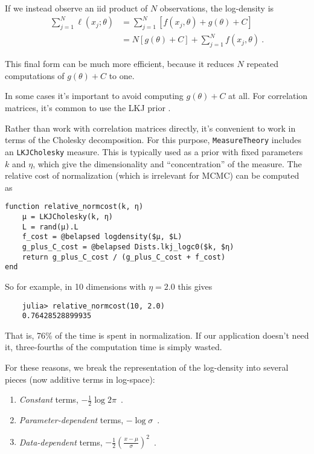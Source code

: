 \documentclass{juliacon}
\begin{document}
If we instead observe an iid product of $N$ observations, the log-density is
\[
\begin{aligned}
\sum_{j=1}^N\ell(x_j; \theta) 
    &= \sum_{j=1}^N \left[ f(x_j,\theta) + g(\theta) + C\right] \\
    &= N [g(\theta) + C] + \sum_{j=1}^N  f(x_j,\theta)\ .
\end{aligned}
\]

This final form can be much more efficient, because it reduces $N$ repeated computations of $g(\theta) + C$ to one. 

In some cases it's important to avoid computing $g(\theta) + C$ at all. For correlation matrices, it's common to use the LKJ prior \cite{LEWANDOWSKI20091989}. 

Rather than work with correlation matrices directly, it's convenient to work in terms of the Cholesky decomposition. For this purpose, \verb|MeasureTheory| includes an \verb|LKJCholesky| measure. This is typically used as a prior with fixed parameters $k$ and $\eta$, which give the dimensionality and ``concentration'' of the measure. The relative cost of normalization (which is irrelevant for MCMC) can be computed as

\begin{verbatim}
function relative_normcost(k, η)
    μ = LKJCholesky(k, η)
    L = rand(μ).L
    f_cost = @belapsed logdensity($μ, $L)
    g_plus_C_cost = @belapsed Dists.lkj_logc0($k, $η)
    return g_plus_C_cost / (g_plus_C_cost + f_cost)
end
\end{verbatim}

So for example, in 10 dimensions with $\eta=2.0$ this gives
\begin{verbatim}
    julia> relative_normcost(10, 2.0)
    0.76428528899935    
\end{verbatim}

That is, 76\% of the time is spent in normalization. If our application doesn't need it, three-fourths of the computation time is simply wasted.

For these reasons, we break the representation of the log-density into several pieces (now additive terms in log-space):
\begin{enumerate}
    \item \emph{Constant} terms,  $-\frac{1}{2}\log 2\pi$\ .
    \item \emph{Parameter-dependent} terms,  $-\log \sigma$\ .
    \item \emph{Data-dependent} terms, $-\frac{1}{2}\left(\frac{x - \mu}{\sigma}\right)^2$\ .
\end{enumerate}
\end{document}
